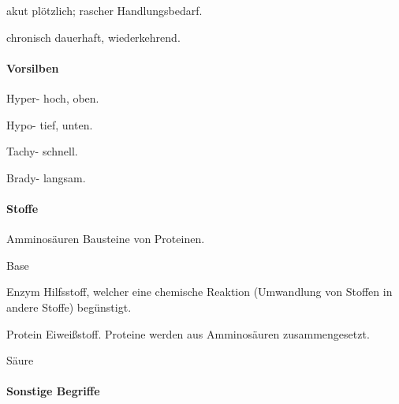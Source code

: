 \begin{multicols}{2}


\begin{compactdesc}
    \item[akut] plötzlich; rascher Handlungsbedarf.
    \item[chronisch] dauerhaft, wiederkehrend.

\end{compactdesc}






\paragraph{Vorsilben}

\begin{compactdesc}
  \item[Hyper-] hoch, oben.
  \item[Hypo-] tief, unten.
  \item[Tachy-] schnell.
  \item[Brady-] langsam.
\end{compactdesc}


\paragraph{Stoffe}
\begin{compactdesc}
  \item[Amminosäuren] Bausteine von Proteinen.
  \item[Base] 
  \item[Enzym] Hilfsstoff, welcher eine chemische Reaktion (Umwandlung von
  Stoffen in andere Stoffe) begünstigt.
  \item[Protein] Eiweißstoff. Proteine werden aus Amminosäuren
  zusammengesetzt.
  \item[Säure] 
  
\end{compactdesc}

\paragraph{Sonstige Begriffe}


\end{multicols}
